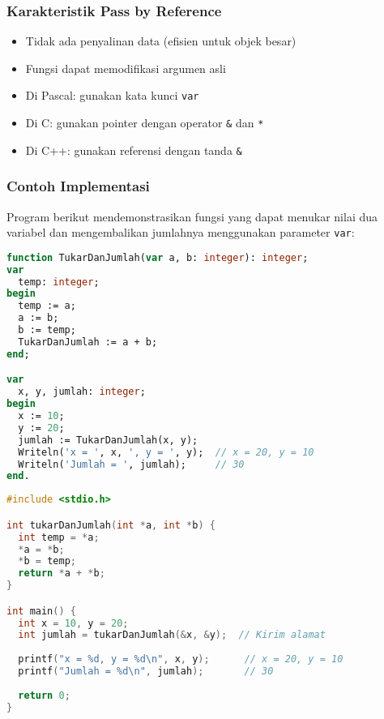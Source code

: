 \documentclass[../main.tex]{subfiles}
\begin{document}
\subsubsection{Karakteristik Pass by Reference}
\begin{itemize}
  \item Tidak ada penyalinan data (efisien untuk objek besar)
  \item Fungsi dapat memodifikasi argumen asli
  \item Di Pascal: gunakan kata kunci \texttt{var}
  \item Di C: gunakan pointer dengan operator \texttt{\&} dan \texttt{*}
  \item Di C++: gunakan referensi dengan tanda \texttt{\&}
\end{itemize}

\subsubsection{Contoh Implementasi}

Program berikut mendemonstrasikan fungsi yang dapat menukar nilai dua variabel dan mengembalikan jumlahnya menggunakan parameter \texttt{var}:

\begin{lstlisting}[language=Pascal, caption={Pass by reference (Pascal)}]
function TukarDanJumlah(var a, b: integer): integer;
var
  temp: integer;
begin
  temp := a;
  a := b;
  b := temp;
  TukarDanJumlah := a + b;
end;

var
  x, y, jumlah: integer;
begin
  x := 10;
  y := 20;
  jumlah := TukarDanJumlah(x, y);
  Writeln('x = ', x, ', y = ', y);  // x = 20, y = 10
  Writeln('Jumlah = ', jumlah);     // 30
end.
\end{lstlisting}

\begin{lstlisting}[language=C, caption={Pass by reference via pointer (C)}]
#include <stdio.h>

int tukarDanJumlah(int *a, int *b) {
  int temp = *a;
  *a = *b;
  *b = temp;
  return *a + *b;
}

int main() {
  int x = 10, y = 20;
  int jumlah = tukarDanJumlah(&x, &y);  // Kirim alamat
  
  printf("x = %d, y = %d\n", x, y);      // x = 20, y = 10
  printf("Jumlah = %d\n", jumlah);       // 30
  
  return 0;
}
\end{lstlisting}
\end{document}

